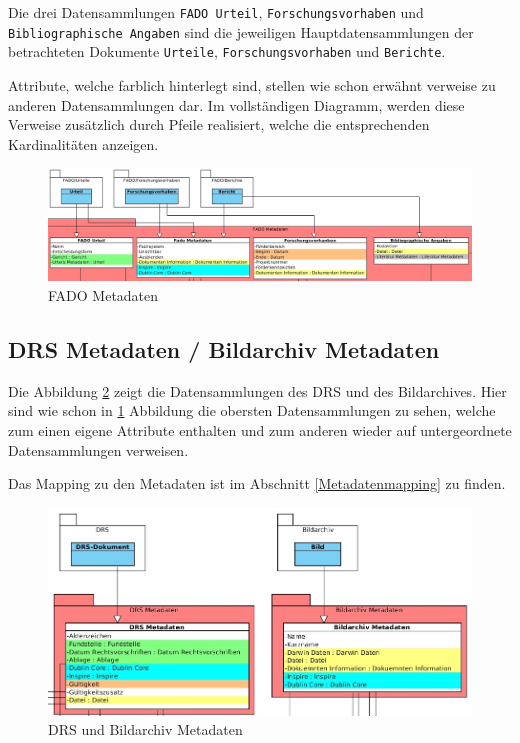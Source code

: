 Die drei Datensammlungen \texttt{FADO Urteil}, \texttt{Forschungsvorhaben} und \texttt{Bibliographische Angaben} sind die jeweiligen Hauptdatensammlungen der betrachteten Dokumente \texttt{Urteile}, \texttt{Forschungsvorhaben} und \texttt{Berichte}.

Attribute, welche farblich hinterlegt sind, stellen wie schon erw\"ahnt verweise zu anderen Datensammlungen dar. Im vollst\"andigen Diagramm, werden diese Verweise zus\"atzlich durch Pfeile realisiert, welche die entsprechenden Kardinalit\"aten anzeigen.
\begin{figure}[!ht]
\centering
\includegraphics[width=16cm]{Bilder/Datenmodell/FADO-Metadaten.jpg}
\caption{FADO Metadaten}
\label{Fado Modell}
\centering
\end{figure}

\FloatBarrier
\subsection{DRS Metadaten / Bildarchiv Metadaten}\label{DRS Bildarchiv Metadaten}
Die Abbildung \ref{DRS und Bildarchiv Modell} zeigt die Datensammlungen des \ac{DRS} und des Bildarchives. Hier sind wie schon in \ref{Fado Modell} Abbildung die obersten Datensammlungen zu sehen, welche zum einen eigene Attribute enthalten und zum anderen wieder auf untergeordnete Datensammlungen verweisen. 

Das Mapping zu den Metadaten ist im Abschnitt \ref{Metadatenmapping} zu finden.
\begin{figure}[!ht]
\centering
\includegraphics[width=12cm]{Bilder/Datenmodell/DRS-Bildarchiv-Metadaten.jpg}
\caption{DRS und Bildarchiv Metadaten}
\label{DRS und Bildarchiv Modell}
\centering
\end{figure}

